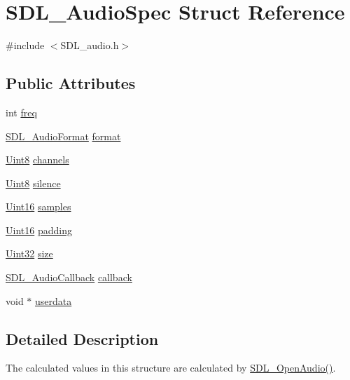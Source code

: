 \hypertarget{struct_s_d_l___audio_spec}{}\section{S\+D\+L\+\_\+\+Audio\+Spec Struct Reference}
\label{struct_s_d_l___audio_spec}


{\ttfamily \#include $<$S\+D\+L\+\_\+audio.\+h$>$}

\subsection*{Public Attributes}
\begin{DoxyCompactItemize}
\item 
int \hyperlink{struct_s_d_l___audio_spec_a8b823ce46fc2e448cf7e6fc141aff6b2}{freq}
\item 
\hyperlink{_s_d_l__audio_8h_a491ed103fd25d920c4e6b7495217ce66}{S\+D\+L\+\_\+\+Audio\+Format} \hyperlink{struct_s_d_l___audio_spec_ae37c634cac5807762f184c8d5d49fc2d}{format}
\item 
\hyperlink{_s_d_l__stdinc_8h_a2944638813a090aa23e62f4da842c3e2}{Uint8} \hyperlink{struct_s_d_l___audio_spec_a31fe8b3710cf23bbef24be8a1749fe46}{channels}
\item 
\hyperlink{_s_d_l__stdinc_8h_a2944638813a090aa23e62f4da842c3e2}{Uint8} \hyperlink{struct_s_d_l___audio_spec_addc462c8a806e6c122eccf63482048f6}{silence}
\item 
\hyperlink{_s_d_l__stdinc_8h_a31fcc0a076c9068668173ee26d33e42b}{Uint16} \hyperlink{struct_s_d_l___audio_spec_a2cdf5e885808c10bfa2810b706e69f95}{samples}
\item 
\hyperlink{_s_d_l__stdinc_8h_a31fcc0a076c9068668173ee26d33e42b}{Uint16} \hyperlink{struct_s_d_l___audio_spec_a738371fc13b54cefef4db16994abeeb6}{padding}
\item 
\hyperlink{_s_d_l__stdinc_8h_add440eff171ea5f55cb00c4a9ab8672d}{Uint32} \hyperlink{struct_s_d_l___audio_spec_a154cf44743ecec78c36dc6c827dd2fdb}{size}
\item 
\hyperlink{_s_d_l__audio_8h_a379fcc25845e46bfa80cb3619fc2821c}{S\+D\+L\+\_\+\+Audio\+Callback} \hyperlink{struct_s_d_l___audio_spec_a1f8d05139f1679dcf359f49251233eac}{callback}
\item 
void $\ast$ \hyperlink{struct_s_d_l___audio_spec_aeec9481666f5f0982c98d3878f175d9b}{userdata}
\end{DoxyCompactItemize}


\subsection{Detailed Description}
The calculated values in this structure are calculated by \hyperlink{_s_d_l__audio_8h_a2edf30e7747584e28041b4986f89f440}{S\+D\+L\+\_\+\+Open\+Audio()}. 

